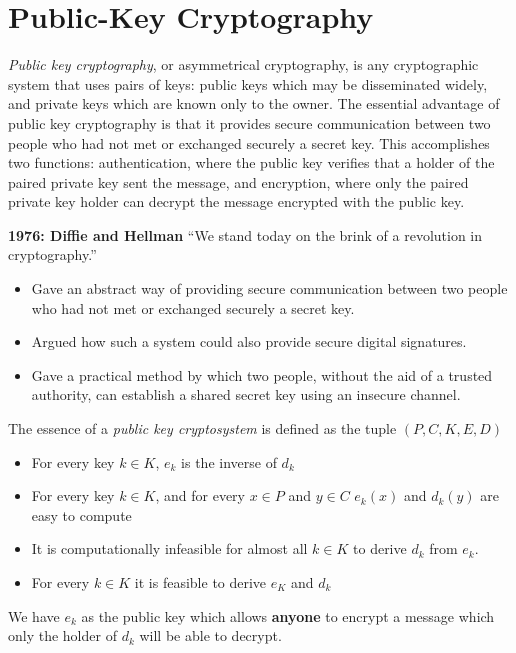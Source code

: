 \section{Public-Key Cryptography}
\textit{Public key cryptography}, or asymmetrical cryptography,
is any cryptographic system that uses pairs of keys: public keys which may be disseminated widely,
and private keys which are known only to the owner.
The essential advantage of public key cryptography is that it provides secure communication between two people who had not met or exchanged securely a secret key.
This accomplishes two functions: authentication, where the public key verifies that a holder of the paired private key sent the message,
and encryption, where only the paired private key holder can decrypt the message encrypted with the public key.

\textbf{1976: Diffie and Hellman}
“We stand today on the brink of a revolution in cryptography.”
\begin{itemize}
    \item Gave an abstract way of providing secure communication between two people who had not met or exchanged securely a secret key.
    \item Argued how such a system could also provide secure digital signatures.
    \item Gave a practical method by which two people, without the aid of a trusted authority, can
        establish a shared secret key using an insecure channel.
\end{itemize}

\begin{definition}
    The essence of a \textit{public key cryptosystem} is defined as the tuple
    $(P,C,K,E,D)$
    \begin{itemize}
        \item For every key $k \in K$, $e_k$ is the inverse of $d_k$
        \item For every key $k \in K$,
            and for every $x \in P$ and $y \in C$
            $e_k(x)$ and $d_k(y)$ are easy to compute
        \item It is computationally infeasible for almost all $k \in K$
            to derive $d_k$ from $e_k$.
        \item For every $k \in K$ it is feasible to derive $e_K$ and $d_k$
    \end{itemize}
    We have $e_k$ as the public key which allows \textbf{anyone} to encrypt a message
    which only the holder of $d_k$ will be able to decrypt.
\end{definition}

